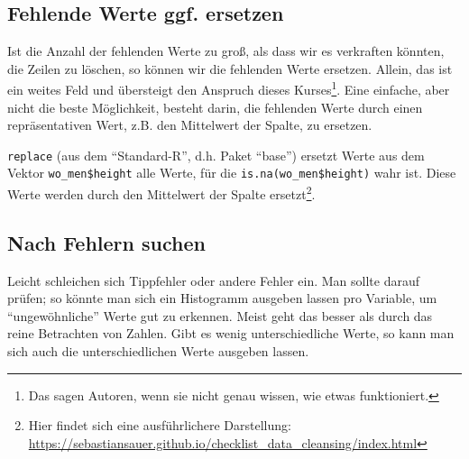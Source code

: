 \documentclass[12pt,ngerman,]{book}
\newenvironment{Shaded}{\begin{snugshade}}{\end{snugshade}}
\newcommand{\KeywordTok}[1]{\textcolor[rgb]{0.13,0.29,0.53}{\textbf{{#1}}}}
\newcommand{\DataTypeTok}[1]{\textcolor[rgb]{0.13,0.29,0.53}{{#1}}}
\newcommand{\StringTok}[1]{\textcolor[rgb]{0.31,0.60,0.02}{{#1}}}
\newcommand{\CommentTok}[1]{\textcolor[rgb]{0.56,0.35,0.01}{\textit{{#1}}}}
\newcommand{\OtherTok}[1]{\textcolor[rgb]{0.56,0.35,0.01}{{#1}}}
\newcommand{\NormalTok}[1]{{#1}}
\let\rmarkdownfootnote\footnote%
\def\footnote{\protect\rmarkdownfootnote}
\renewenvironment{Shaded}{\begin{kframe}}{\end{kframe}}
\begin{document}
\subsection{Fehlende Werte ggf.
ersetzen}\label{fehlende-werte-ggf.-ersetzen}

Ist die Anzahl der fehlenden Werte zu groß, als dass wir es verkraften
könnten, die Zeilen zu löschen, so können wir die fehlenden Werte
ersetzen. Allein, das ist ein weites Feld und übersteigt den Anspruch
dieses Kurses\footnote{Das sagen Autoren, wenn sie nicht genau wissen,
  wie etwas funktioniert.}. Eine einfache, aber nicht die beste
Möglichkeit, besteht darin, die fehlenden Werte durch einen
repräsentativen Wert, z.B. den Mittelwert der Spalte, zu ersetzen.

\begin{Shaded}
\end{Shaded}

\texttt{replace} (aus dem ``Standard-R'', d.h. Paket ``base'') ersetzt
Werte aus dem Vektor \texttt{wo\_men\$height} alle Werte, für die
\texttt{is.na(wo\_men\$height)} wahr ist. Diese Werte werden durch den
Mittelwert der Spalte ersetzt\footnote{Hier findet sich eine
  ausführlichere Darstellung:
  \url{https://sebastiansauer.github.io/checklist_data_cleansing/index.html}}.

\subsection{Nach Fehlern suchen}\label{nach-fehlern-suchen}

Leicht schleichen sich Tippfehler oder andere Fehler ein. Man sollte
darauf prüfen; so könnte man sich ein Histogramm ausgeben lassen pro
Variable, um ``ungewöhnliche'' Werte gut zu erkennen. Meist geht das
besser als durch das reine Betrachten von Zahlen. Gibt es wenig
unterschiedliche Werte, so kann man sich auch die unterschiedlichen
Werte ausgeben lassen.

\begin{Shaded}
\end{Shaded}
\end{document}
